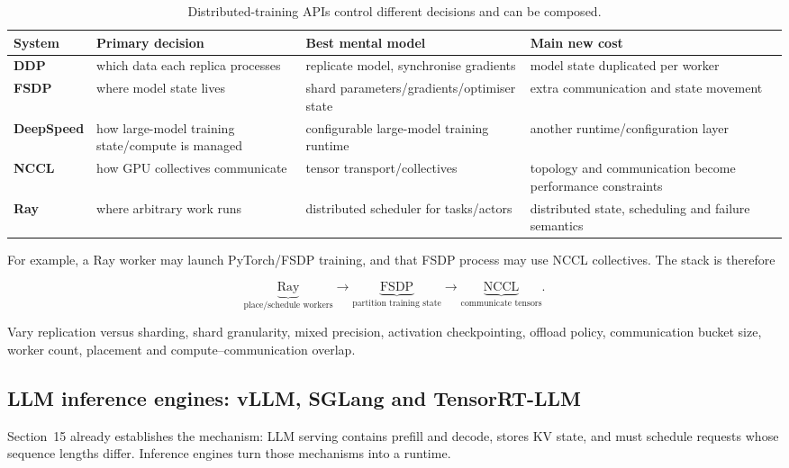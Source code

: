 \begin{table}[ht]
\centering
\small
\begin{tabularx}{\textwidth}{>{\bfseries}p{2.0cm} X X X}
\toprule
System & Primary decision & Best mental model & Main new cost \\
\midrule
DDP & which data each replica processes & replicate model, synchronise gradients & model state duplicated per worker \\
FSDP & where model state lives & shard parameters/gradients/optimiser state & extra communication and state movement \\
DeepSpeed & how large-model training state/compute is managed & configurable large-model training runtime & another runtime/configuration layer \\
NCCL & how GPU collectives communicate & tensor transport/collectives & topology and communication become performance constraints \\
Ray & where arbitrary work runs & distributed scheduler for tasks/actors & distributed state, scheduling and failure semantics \\
\bottomrule
\end{tabularx}
\caption{Distributed-training APIs control different decisions and can be composed.}
\label{tab:distributed-apis}
\end{table}

For example, a Ray worker may launch PyTorch/FSDP training, and that FSDP process may use NCCL collectives.
The stack is therefore

\[
\underbrace{\text{Ray}}_{\text{place/schedule workers}}
\rightarrow
\underbrace{\text{FSDP}}_{\text{partition training state}}
\rightarrow
\underbrace{\text{NCCL}}_{\text{communicate tensors}}.
\]

\begin{calloutdegreeexperiment}
Vary replication versus sharding, shard granularity, mixed precision, activation checkpointing, offload policy, communication bucket size, worker count, placement and compute--communication overlap.
\end{calloutdegreeexperiment}


\subsection{LLM inference engines: vLLM, SGLang and TensorRT-LLM}

Section~15 already establishes the mechanism: LLM serving contains prefill and decode, stores KV state, and must schedule requests whose sequence lengths differ.
Inference engines turn those mechanisms into a runtime.

